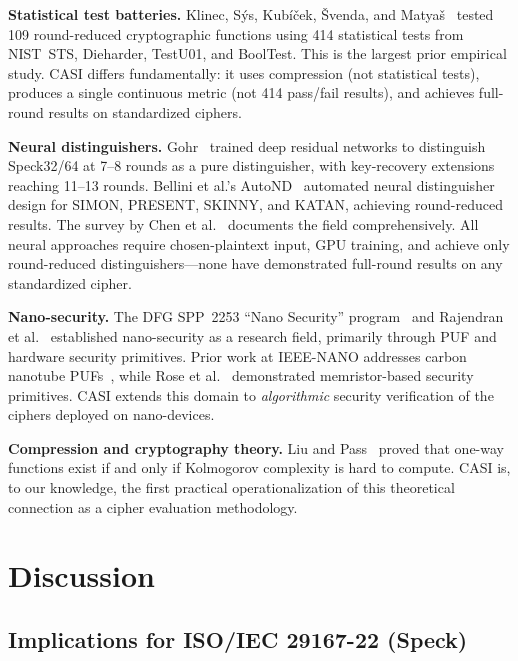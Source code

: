 \documentclass[conference]{IEEEtran}
\begin{document}
\textbf{Statistical test batteries.}
Klinec, S\'{y}s, Kubí\v{c}ek, \v{S}venda, and Matya\v{s}~\cite{kubicek2020} tested 109 round-reduced cryptographic functions using 414 statistical tests from NIST~STS, Dieharder, TestU01, and BoolTest.
This is the largest prior empirical study.
CASI differs fundamentally: it uses compression (not statistical tests), produces a single continuous metric (not 414 pass/fail results), and achieves full-round results on standardized ciphers.

\textbf{Neural distinguishers.}
Gohr~\cite{gohr2019} trained deep residual networks to distinguish Speck32/64 at 7--8 rounds as a pure distinguisher, with key-recovery extensions reaching 11--13 rounds.
Bellini et al.'s AutoND~\cite{bellini2024} automated neural distinguisher design for SIMON, PRESENT, SKINNY, and KATAN, achieving round-reduced results.
The survey by Chen et al.~\cite{chen2024sixyears} documents the field comprehensively.
All neural approaches require chosen-plaintext input, GPU training, and achieve only round-reduced distinguishers---none have demonstrated full-round results on any standardized cipher.

\textbf{Nano-security.}
The DFG SPP~2253 ``Nano Security'' program~\cite{polian2021} and Rajendran et al.~\cite{rajendran2015} established nano-security as a research field, primarily through PUF and hardware security primitives.
Prior work at IEEE-NANO addresses carbon nanotube PUFs~\cite{cntpuf2023}, while Rose et al.~\cite{memristor2013} demonstrated memristor-based security primitives.
CASI extends this domain to \emph{algorithmic} security verification of the ciphers deployed on nano-devices.

\textbf{Compression and cryptography theory.}
Liu and Pass~\cite{liupass2020} proved that one-way functions exist if and only if Kolmogorov complexity is hard to compute.
CASI is, to our knowledge, the first practical operationalization of this theoretical connection as a cipher evaluation methodology.


\section{Discussion}
\label{sec:discussion}

\subsection{Implications for ISO/IEC 29167-22 (Speck)}
\end{document}
